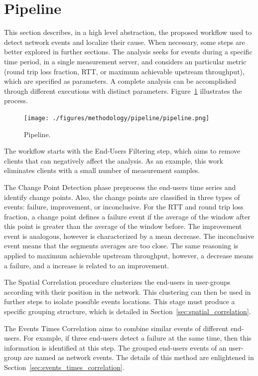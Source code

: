 \section{Pipeline}

This section describes, in a high level abstraction, the proposed workflow
used to detect network events and localize their cause. When necessary, some
steps are better explored in further sections.
The analysis seeks for events during a specific time period, in a single
measurement server, and considers an
particular metric (round trip loss fraction, RTT, or maximum achievable
upstream throughput),
which are specified as parameters.
A complete analysis can be accomplished through different
executions with distinct parameters.
Figure~\ref{fig:pipeline} illustrates the process.

\begin{figure}[H]
    \centering
    \texttt{[image: ./figures/methodology/pipeline/pipeline.png]}
    \caption{Pipeline.}
\label{fig:pipeline}
\end{figure}%

The workflow starts with the End-Users Filtering step,
which aims to remove clients that can negatively affect the analysis.
As an example, this work eliminates clients
with a small number of measurement samples.

The Change Point Detection phase preprocess the end-users time series and
identify change points.
Also, the change points are classified in three types of events: failure,
improvement, or inconclusive. For the RTT and round trip loss fraction,
a change point defines a
failure event if the average of the window after this point is greater than the
average of the window before. The improvement event is analogous, however is
characterized by a mean decrease.
The inconclusive event means that the segments averages are too close.
The same reasoning is applied to maximum
achievable upstream throughput, however, a decrease means a failure, and a
increase is related to an improvement.

The Spatial Correlation procedure clusterizes the end-users in user-groups
according with their position in the network. This clustering can then be used
in further steps to isolate possible events locations.
This stage must produce a specific grouping structure, which is detailed in
Section~\ref{sec:spatial_correlation}.

The Events Times Correlation aims to combine similar events of different
end-users. For example, if three end-users detect a failure at
the same time, then this information is identified at this step.
The grouped end-users events of an user-group are named as network events.
The details of this method are enlightened in
Section~\ref{sec:events_times_correlation}.

